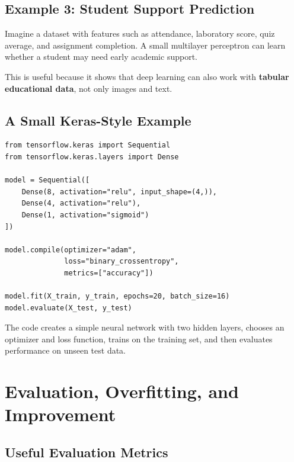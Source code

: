 \documentclass[11pt,a4paper]{article}
\begin{document}
\subsection{Example 3: Student Support Prediction}

\begin{examplebox}
Imagine a dataset with features such as attendance, laboratory score, quiz average, and assignment completion. A small multilayer perceptron can learn whether a student may need early academic support.

This is useful because it shows that deep learning can also work with \textbf{tabular educational data}, not only images and text.
\end{examplebox}

\subsection{A Small Keras-Style Example}

\begin{lstlisting}
from tensorflow.keras import Sequential
from tensorflow.keras.layers import Dense

model = Sequential([
    Dense(8, activation="relu", input_shape=(4,)),
    Dense(4, activation="relu"),
    Dense(1, activation="sigmoid")
])

model.compile(optimizer="adam",
              loss="binary_crossentropy",
              metrics=["accuracy"])

model.fit(X_train, y_train, epochs=20, batch_size=16)
model.evaluate(X_test, y_test)
\end{lstlisting}

\begin{conceptbox}
The code creates a simple neural network with two hidden layers, chooses an optimizer and loss function, trains on the training set, and then evaluates performance on unseen test data.
\end{conceptbox}

\section{Evaluation, Overfitting, and Improvement}

\subsection{Useful Evaluation Metrics}
\end{document}
